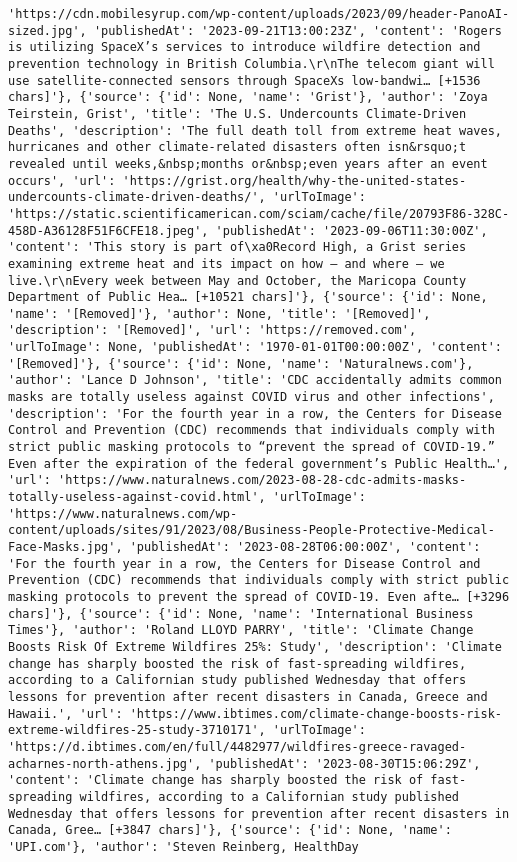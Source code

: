 \documentclass[
  letterpaper,
  DIV=11,
  numbers=noendperiod]{scrartcl}
\begin{document}
\begin{verbatim}
'https://cdn.mobilesyrup.com/wp-content/uploads/2023/09/header-PanoAI-sized.jpg', 'publishedAt': '2023-09-21T13:00:23Z', 'content': 'Rogers is utilizing SpaceX’s services to introduce wildfire detection and prevention technology in British Columbia.\r\nThe telecom giant will use satellite-connected sensors through SpaceXs low-bandwi… [+1536 chars]'}, {'source': {'id': None, 'name': 'Grist'}, 'author': 'Zoya Teirstein, Grist', 'title': 'The U.S. Undercounts Climate-Driven Deaths', 'description': 'The full death toll from extreme heat waves, hurricanes and other climate-related disasters often isn&rsquo;t revealed until weeks,&nbsp;months or&nbsp;even years after an event occurs', 'url': 'https://grist.org/health/why-the-united-states-undercounts-climate-driven-deaths/', 'urlToImage': 'https://static.scientificamerican.com/sciam/cache/file/20793F86-328C-458D-A36128F51F6CFE18.jpeg', 'publishedAt': '2023-09-06T11:30:00Z', 'content': 'This story is part of\xa0Record High, a Grist series examining extreme heat and its impact on how — and where — we live.\r\nEvery week between May and October, the Maricopa County Department of Public Hea… [+10521 chars]'}, {'source': {'id': None, 'name': '[Removed]'}, 'author': None, 'title': '[Removed]', 'description': '[Removed]', 'url': 'https://removed.com', 'urlToImage': None, 'publishedAt': '1970-01-01T00:00:00Z', 'content': '[Removed]'}, {'source': {'id': None, 'name': 'Naturalnews.com'}, 'author': 'Lance D Johnson', 'title': 'CDC accidentally admits common masks are totally useless against COVID virus and other infections', 'description': 'For the fourth year in a row, the Centers for Disease Control and Prevention (CDC) recommends that individuals comply with strict public masking protocols to “prevent the spread of COVID-19.” Even after the expiration of the federal government’s Public Health…', 'url': 'https://www.naturalnews.com/2023-08-28-cdc-admits-masks-totally-useless-against-covid.html', 'urlToImage': 'https://www.naturalnews.com/wp-content/uploads/sites/91/2023/08/Business-People-Protective-Medical-Face-Masks.jpg', 'publishedAt': '2023-08-28T06:00:00Z', 'content': 'For the fourth year in a row, the Centers for Disease Control and Prevention (CDC) recommends that individuals comply with strict public masking protocols to prevent the spread of COVID-19. Even afte… [+3296 chars]'}, {'source': {'id': None, 'name': 'International Business Times'}, 'author': 'Roland LLOYD PARRY', 'title': 'Climate Change Boosts Risk Of Extreme Wildfires 25%: Study', 'description': 'Climate change has sharply boosted the risk of fast-spreading wildfires, according to a Californian study published Wednesday that offers lessons for prevention after recent disasters in Canada, Greece and Hawaii.', 'url': 'https://www.ibtimes.com/climate-change-boosts-risk-extreme-wildfires-25-study-3710171', 'urlToImage': 'https://d.ibtimes.com/en/full/4482977/wildfires-greece-ravaged-acharnes-north-athens.jpg', 'publishedAt': '2023-08-30T15:06:29Z', 'content': 'Climate change has sharply boosted the risk of fast-spreading wildfires, according to a Californian study published Wednesday that offers lessons for prevention after recent disasters in Canada, Gree… [+3847 chars]'}, {'source': {'id': None, 'name': 'UPI.com'}, 'author': 'Steven Reinberg, HealthDay 
\end{verbatim}
\end{document}
